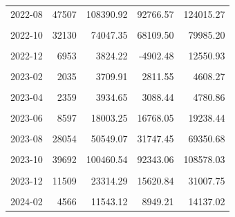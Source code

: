 \begin{longtable}[t]{crrrr}
2022-08 & 47507 & 108390.92 & 92766.57 & 124015.27\\
\cellcolor{gray!10}{2022-09} & \cellcolor{gray!10}{60313} & \cellcolor{gray!10}{158863.83} & \cellcolor{gray!10}{148917.74} & \cellcolor{gray!10}{168809.92}\\
2022-10 & 32130 & 74047.35 & 68109.50 & 79985.20\\
\cellcolor{gray!10}{2022-11} & \cellcolor{gray!10}{16978} & \cellcolor{gray!10}{26368.08} & \cellcolor{gray!10}{20272.27} & \cellcolor{gray!10}{32463.89}\\
2022-12 & 6953 & 3824.22 & -4902.48 & 12550.93\\
\cellcolor{gray!10}{2023-01} & \cellcolor{gray!10}{2494} & \cellcolor{gray!10}{2563.94} & \cellcolor{gray!10}{588.54} & \cellcolor{gray!10}{4539.34}\\
2023-02 & 2035 & 3709.91 & 2811.55 & 4608.27\\
\cellcolor{gray!10}{2023-03} & \cellcolor{gray!10}{2585} & \cellcolor{gray!10}{5184.24} & \cellcolor{gray!10}{3838.15} & \cellcolor{gray!10}{6530.34}\\
2023-04 & 2359 & 3934.65 & 3088.44 & 4780.86\\
\cellcolor{gray!10}{2023-05} & \cellcolor{gray!10}{5286} & \cellcolor{gray!10}{9965.35} & \cellcolor{gray!10}{9172.57} & \cellcolor{gray!10}{10758.13}\\
2023-06 & 8597 & 18003.25 & 16768.05 & 19238.44\\
\cellcolor{gray!10}{2023-07} & \cellcolor{gray!10}{13985} & \cellcolor{gray!10}{21824.08} & \cellcolor{gray!10}{19440.66} & \cellcolor{gray!10}{24207.50}\\
2023-08 & 28054 & 50549.07 & 31747.45 & 69350.68\\
\cellcolor{gray!10}{2023-09} & \cellcolor{gray!10}{46486} & \cellcolor{gray!10}{104796.64} & \cellcolor{gray!10}{94721.10} & \cellcolor{gray!10}{114872.18}\\
2023-10 & 39692 & 100460.54 & 92343.06 & 108578.03\\
\cellcolor{gray!10}{2023-11} & \cellcolor{gray!10}{26819} & \cellcolor{gray!10}{64125.56} & \cellcolor{gray!10}{52372.65} & \cellcolor{gray!10}{75878.47}\\
2023-12 & 11509 & 23314.29 & 15620.84 & 31007.75\\
\cellcolor{gray!10}{2024-01} & \cellcolor{gray!10}{4555} & \cellcolor{gray!10}{10342.39} & \cellcolor{gray!10}{7810.58} & \cellcolor{gray!10}{12874.20}\\
2024-02 & 4566 & 11543.12 & 8949.21 & 14137.02\\

\end{longtable}
